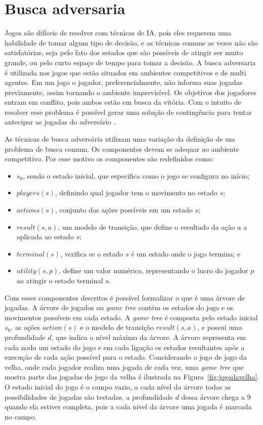 \section{Busca adversaria}

Jogos são difíceis de resolver com técnicas de IA, pois eles requerem uma habilidade de tomar algum tipo de decisão, e as técnicas comuns as vezes não são satisfatórias, seja pelo fato dos estados que são possíveis de atingir ser muito grande, ou pelo curto espaço de tempo para tomar a decisão.
A busca adversaria é utilizada nos jogos que estão situados em ambientes competitivos e de multi agentes. Em um jogo o jogador, preferencialmente, não informa suas jogadas previamente, assim tornando o ambiente imprevisível. Os objetivos dos jogadores entram em conflito, pois ambos estão em busca da vitória. 
Com o intuito de resolver esse problema é possível gerar uma solução de contingência para tentar antecipar as jogadas do adversário \cite{intelligence2003modern}. 

As técnicas de busca adversária utilizam uma variação da definição de um problema de busca comum. Os componentes devem se adequar ao ambiente competitivo. Por esse motivo os componentes são redefinidos como:

\begin{itemize}
	\item $s_{0}$, sendo o estado inicial, que especifica como o jogo se configura no início;
	\item $players(s)$, definindo qual jogador tem o movimento no estado $s$;
	\item $actions(s)$, conjunto das ações possíveis em um estado $s$;
	\item $result(s, a)$, um modelo de transição, que define o resultado da ação $a$ a aplicada ao estado $s$;
	\item $terminal(s)$, verifica se o estado $s$ é um estado onde o jogo termina; e
	\item $utility(s,p)$, define um valor numérico, representando o lucro do jogador $p$ ao atingir o estado terminal $s$.
\end{itemize}

Com esses componentes descritos é possível formalizar o que é uma árvore de jogadas. A árvore de jogados ou \textit{game tree} contém os estados do jogo e os movimentos possíveis em cada estado. A \textit{game tree} é composta pelo estado inicial $s_{0}$, as ações $action(s)$ e o modelo de transição $result(s, a)$, e possui uma profundidade $d$, que indica o nível máximo da árvore. 
A árvore representa em cada nodo um estado do jogo e em cada ligação os estados resultantes após a execução de cada ação possível para o estado. Considerando o jogo de jogo da velha, onde cada jogador realiza uma jogada de cada vez, uma \textit{game tree} que mostra parte das jogadas do jogo da velha é ilustrada na Figura~\ref{fig:jogodavelha}. O estado inicial do jogo é o campo vazio, a cada nível da árvore todas as possibilidades de jogadas são testadas, a profundidade $d$ dessa árvore chega a 9 quando ela estiver completa, pois a cada nível da árvore uma jogada é marcada no campo. 

